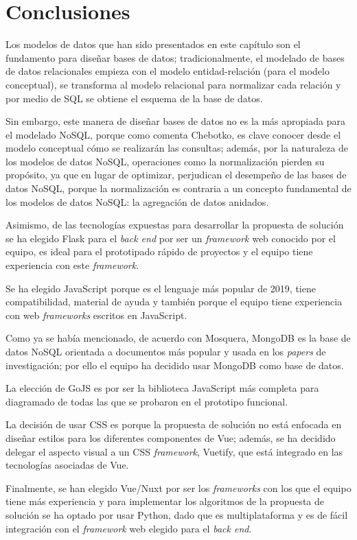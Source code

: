 \section{Conclusiones}


Los modelos de datos que han sido presentados en este capítulo son el fundamento para diseñar bases de datos; tradicionalmente, el modelado de bases de datos relacionales empieza con el modelo entidad-relación (para el modelo conceptual), se transforma al modelo relacional para normalizar cada relación y por medio de SQL se obtiene el esquema de la base de datos. 


Sin embargo, este manera de diseñar bases de datos no es la más apropiada para el modelado NoSQL, porque como comenta Chebotko\cite{chebotko_big_2015}, es clave conocer desde el modelo conceptual cómo se realizarán las consultas; además, por la naturaleza de los modelos de datos NoSQL, operaciones como la normalización pierden su propósito, ya que en lugar de optimizar, perjudican el desempeño de las bases de datos NoSQL, porque la normalización es contraria a un concepto fundamental de los modelos de datos NoSQL: la agregación de datos anidados.

Asimismo, de las tecnologías expuestas para desarrollar la propuesta de solución se ha elegido Flask para el \textit{back end} por ser un \textit{framework} web conocido por el equipo, es ideal para el prototipado rápido de proyectos y el equipo tiene experiencia con este \textit{framework}.


Se ha elegido JavaScript porque es el lenguaje más popular de 2019, tiene compatibilidad, material de ayuda y también porque el equipo tiene experiencia con web \textit{frameworks} escritos en JavaScript.


Como ya se había mencionado, de acuerdo con Mosquera\cite{martinez-mosquera_modeling_2020}, MongoDB es la base de datos NoSQL orientada a documentos más popular y usada en los \textit{papers} de investigación; por ello el equipo ha decidido usar MongoDB como base de datos.


La elección de GoJS es por ser la biblioteca JavaScript más completa para diagramado de todas las que se probaron en el prototipo funcional.



La decisión de usar CSS es porque la propuesta de solución no está enfocada en diseñar estilos para los diferentes componentes de Vue; además, se ha decidido delegar el aspecto visual a un CSS \textit{framework}, Vuetify, que está integrado en las tecnologías asociadas de Vue.


Finalmente, se han elegido Vue/Nuxt por ser los \textit{frameworks} con los que el equipo tiene más experiencia y para implementar los algoritmos de la propuesta de solución se ha optado por usar Python, dado que es multiplataforma y es de fácil integración con el \textit{framework} web elegido para el \textit{back end}.
